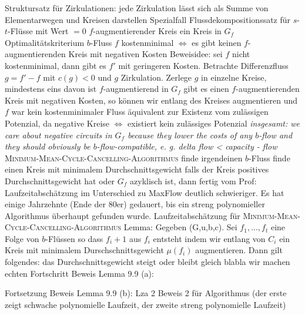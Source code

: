 \begin{outline}
    \1 Struktursatz für Zirkulationen:
        \2 jede Zirkulation lässt sich als Summe von Elementarwegen und Kreisen darstellen
        \2 Spezialfall Flussdekompositionssatz für $s$-$t$-Flüsse mit Wert $= 0$
    \1 $f$-augmentierender Kreis
        \2 ein Kreis in $G_f$
    \1 Optimalitätskriterium
        \2 $b$-Fluss $f$ kostenminimal $\iff$ es gibt keinen $f$-augmentierenden Kreis mit negativen Kosten
        \2 Beweisidee:
            \3 sei $f$ nicht kostenminimal, dann gibt es $f'$ mit geringeren Kosten. Betrachte Differenzfluss $g=f'-f$ mit $c(g)<0$ und $g$ Zirkulation. Zerlege $g$ in einzelne Kreise, mindestens eins davon ist $f$-augmentierend in $G_f$
            \3 gibt es einen $f$-augmentierenden Kreis mit negativen Kosten, so können wir entlang des Kreises augmentieren und $f$ war kein kostenminimaler Fluss 
        \2 äquivalent zur Existenz vom zulässigen Potenzial, da negative Kreise $\iff$ existiert kein zulässiges Potenzial
        \2 \textit{insgesamt: we care about negative circuits in $G_f$ because they lower the costs of any $b$-flow and they should obviously be $b$-flow-compatible, e. g. delta flow < capacity - flow}
    \1 \textsc{Minimum-Mean-Cycle-Cancelling-Algorithmus}
        \2 finde irgendeinen $b$-Fluss
        \2 finde einen Kreis mit minimalem Durchschnittsgewicht
        \2 falls der Kreis positives Durchschnittsgewicht hat oder $G_f$ azyklisch ist, dann fertig
\0 vom Prof: Laufzeitabschätzung im Unterschied zu MaxFlow deutlich schwieriger. Es hat einige Jahrzehnte (Ende der 80er) gedauert, bis ein streng polynomieller Algorithmus überhaupt gefunden wurde. 
    \1 Laufzeitabschätzung für \textsc{Minimum-Mean-Cycle-Cancelling-Algorithmus}
        \2 Lemma: Gegeben (G,u,b,c). Sei $f_1,...,f_t$ eine Folge von $b$-Flüssen so dass $f_i+1$ aus $f_i$ entsteht indem wir entlang von $C_i$ ein Kreis mit minimalem Durschschnittsgewicht $\mu(f_i)$ augmentieren. Dann gilt folgendes:
            \3 das Durchschnittsgewicht steigt oder bleibt gleich
            \3 blabla wir machen echten Fortschritt
        \2 Beweis Lemma 9.9 (a):
\end{outline}


\begin{outline}
    \1 Fortsetzung
        \2 Beweis Lemma 9.9 (b):
    \1 Lza 2 Beweis 2 für Algorithmus (der erste zeigt schwache polynomielle Laufzeit, der zweite streng polynomielle Laufzeit)
\end{outline}

